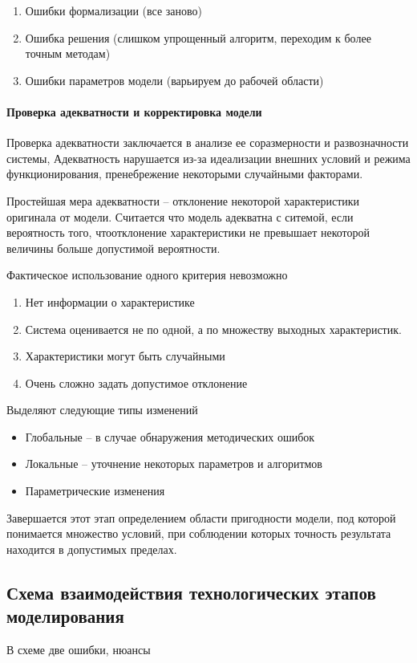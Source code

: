 \begin{enumerate}
    \item Ошибки формализации (все заново)
    \item Ошибка решения (слишком упрощенный алгоритм, переходим к более точным методам)
    \item Ошибки параметров модели (варьируем до рабочей области)
\end{enumerate}

\paragraph{Проверка адекватности и корректировка модели}

Проверка адекватности заключается в анализе ее соразмерности и развозначности системы, Адекватность нарушается из-за идеализации внешних условий и режима функционирования, пренебрежение некоторыми случайными факторами.

Простейшая мера адекватности -- отклонение некоторой характеристики оригинала от модели. Считается что модель адекватна с ситемой, если вероятность того, чтоотклонение характеристики не превышает некоторой величины больше допустимой вероятности.

Фактическое использование одного критерия невозможно

\begin{enumerate}
    \item Нет информации о характеристике
    \item Система оценивается не по одной, а по множеству выходных характеристик.
    \item Характеристики могут быть случайными
    \item Очень сложно задать допустимое отклонение
\end{enumerate}

Выделяют следующие типы изменений

\begin{itemize}
    \item Глобальные -- в случае обнаружения методических ошибок
    \item Локальные -- уточнение некоторых параметров и алгоритмов
    \item Параметрические изменения
\end{itemize}

Завершается этот этап определением области пригодности модели, под которой понимается множество условий, при соблюдении которых точность результата находится в допустимых пределах.

\subsection{Схема взаимодействия технологических этапов моделирования}

В схеме две ошибки, нюансы
